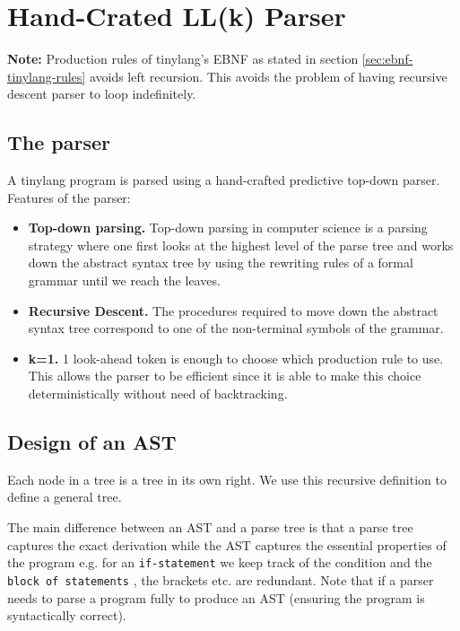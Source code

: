 \chapter{Hand-Crated LL(k) Parser}
\textbf{Note: } Production rules of tinylang’s EBNF as stated
in section \ref{sec:ebnf-tinylang-rules} avoids left recursion. This avoids the problem of having recursive descent parser to loop indefinitely.
\section{The parser}
A tinylang program is parsed using a hand-crafted predictive top-down
parser.
Features of the parser:
\begin{itemize}
	\item \textbf{Top-down parsing.} Top-down parsing in computer science is a parsing strategy where one first looks at the highest level of the parse tree and works down the abstract syntax tree by using the rewriting rules of a formal grammar until we reach the leaves.
	\item  \textbf{Recursive Descent.} The procedures required to move down the abstract syntax tree correspond to one of the non-terminal symbols of the grammar.
	\item \textbf{k=1.} 1 look-ahead token is enough to choose which production rule to use. This allows the parser to be eﬀicient since it is able to make this choice deterministically without need of backtracking.
\end{itemize}



\section{Design of an AST}
\label{sec:design of an ast}
Each node in a tree is a tree in its own right.  We use this recursive definition to define a general tree.

The main difference between an AST and a parse tree is that a parse tree captures the exact derivation while the AST captures the essential properties of the program   e.g. for an \verb!if-statement! we keep track of the condition and the \verb!block of statements! , the brackets etc. are redundant. Note  that if a parser needs to parse a program fully to produce an AST (ensuring the program is syntactically correct).



